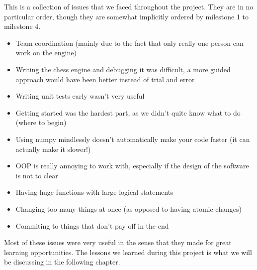 This is a collection of issues that we faced throughout
the project. They are in no particular order,
though they are somewhat implicitly ordered
by milestone 1 to milestone 4.

\begin{itemize}
  \item Team coordination (mainly due to the fact that only really one person can work on the engine)
  \item{Writing the chess engine and debugging it was difficult,
  a more guided approach would have been better instead of trial and error}
  \item Writing unit tests early wasn't very useful
  \item Getting started was the hardest part, as we didn't quite know what to do (where to begin)
  \item{Using numpy mindlessly doesn't automatically make your code faster
  (it can actually make it slower!)}
  \item{OOP is really annoying to work with,
  especially if the design of the software is not to clear}
  \item Having huge functions with large logical statements
  \item Changing too many things at once (as opposed to having atomic changes)
  \item Commiting to things that don't pay off in the end
\end{itemize}

Most of these issues were very useful in the sense
that they made for great learning opportunities.
The lessons we learned during this project
is what we will be discussing in the following chapter.

